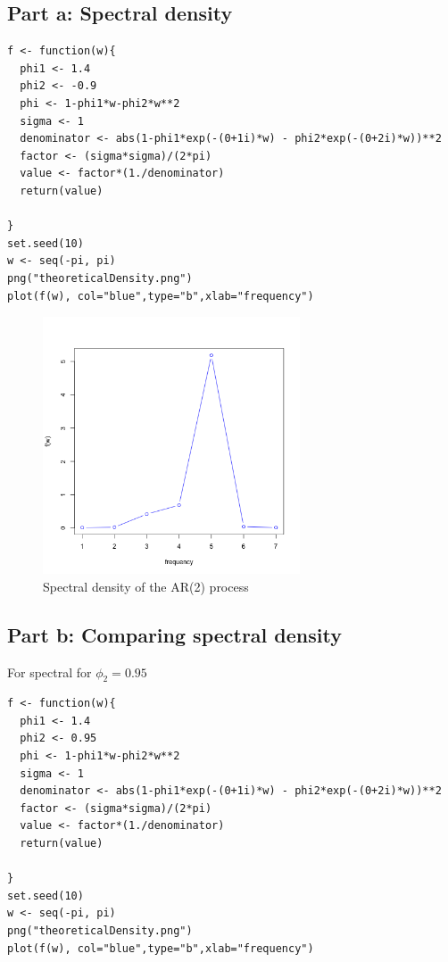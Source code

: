 \documentclass[11pt, oneside]{article}   	%
\begin{document}
 \subsection{Part a: Spectral density}
 \begin{lstlisting}
f <- function(w){
  phi1 <- 1.4
  phi2 <- -0.9
  phi <- 1-phi1*w-phi2*w**2
  sigma <- 1
  denominator <- abs(1-phi1*exp(-(0+1i)*w) - phi2*exp(-(0+2i)*w))**2
  factor <- (sigma*sigma)/(2*pi)
  value <- factor*(1./denominator)
  return(value)

}
set.seed(10)
w <- seq(-pi, pi)
png("theoreticalDensity.png")
plot(f(w), col="blue",type="b",xlab="frequency")
\end{lstlisting}

\begin{figure}[H] %
   \centering
   \includegraphics[width=3in]{../code/theoreticalDensity.png} 
   \caption{Spectral density of the AR(2) process}
   \label{fig:sd}
\end{figure}

\subsection{Part b: Comparing spectral density}
For spectral for $\phi_{2}=0.95$
 \begin{lstlisting}
f <- function(w){
  phi1 <- 1.4
  phi2 <- 0.95
  phi <- 1-phi1*w-phi2*w**2
  sigma <- 1
  denominator <- abs(1-phi1*exp(-(0+1i)*w) - phi2*exp(-(0+2i)*w))**2
  factor <- (sigma*sigma)/(2*pi)
  value <- factor*(1./denominator)
  return(value)

}
set.seed(10)
w <- seq(-pi, pi)
png("theoreticalDensity.png")
plot(f(w), col="blue",type="b",xlab="frequency")
\end{lstlisting}
\end{document}
